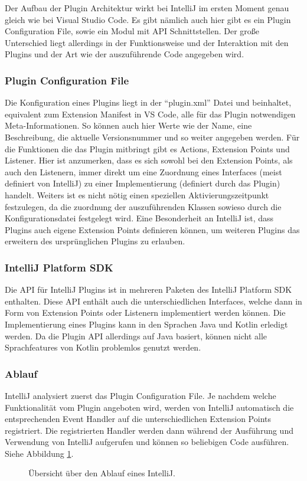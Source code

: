 Der Aufbau der Plugin Architektur wirkt bei IntelliJ im ersten Moment genau
gleich wie bei Visual Studio Code. Es gibt nämlich auch hier gibt
es ein Plugin Configuration File, sowie ein Modul mit API Schnittstellen.
Der große Unterschied liegt allerdings in der Funktionsweise und der Interaktion
mit den Plugins und der Art wie der auszuführende Code angegeben wird.
\subsubsection{Plugin Configuration File}
  Die Konfiguration eines Plugins liegt in der \enquote{plugin.xml} Datei und
  beinhaltet, equivalent zum Extension Manifest in VS Code, alle für das Plugin
  notwendigen Meta-Informationen. So können auch hier Werte wie der Name,
  eine Beschreibung, die aktuelle Versionsnummer und so weiter angegeben werden.
  Für die Funktionen die das Plugin mitbringt gibt es Actions, Extension Points
  und Listener. Hier ist anzumerken, dass es sich sowohl bei den Extension Points,
  als auch den Listenern, immer direkt um eine Zuordnung eines Interfaces
  (meist definiert von IntelliJ) zu einer Implementierung (definiert durch das Plugin)
  handelt. Weiters ist es nicht nötig einen speziellen Aktivierungszeitpunkt
  festzulegen, da die zuordnung der auszuführenden Klassen sowieso durch 
  die Konfigurationsdatei festgelegt wird. Eine Besonderheit an IntelliJ ist,
  dass Plugins auch eigene Extension Points definieren können, um weiteren Plugins
  das erweitern des ursprünglichen Plugins zu erlauben.
\subsubsection{IntelliJ Platform SDK}
  Die API für IntelliJ Plugins ist in mehreren Paketen des IntelliJ 
  Platform SDK enthalten. Diese API enthält auch die unterschiedlichen
  Interfaces, welche dann in Form von Extension Points oder Listenern implementiert
  werden können. Die Implementierung eines Plugins kann in den Sprachen Java
  und Kotlin erledigt werden. Da die Plugin API allerdings auf Java basiert, können
  nicht alle Sprachfeatures von Kotlin problemlos genutzt werden.
\subsubsection{Ablauf}
  IntelliJ analysiert zuerst das Plugin Configuration File.
  Je nachdem welche Funktionalität vom Plugin angeboten wird, werden
  von IntelliJ automatisch die entsprechenden Event Handler 
  auf die unterschiedlichen Extension Points registriert. 
  Die registrierten Handler werden dann während der Ausführung und Verwendung
  von IntelliJ aufgerufen und können so beliebigen Code ausführen.
  Siehe Abbildung \ref{fig:diagram_IntelliJExtensionArchitecture}.
  \begin{figure}
    \centering
    \caption{Übersicht über den Ablauf eines IntelliJ.}
    \label{fig:diagram_IntelliJExtensionArchitecture}
  \end{figure}   

